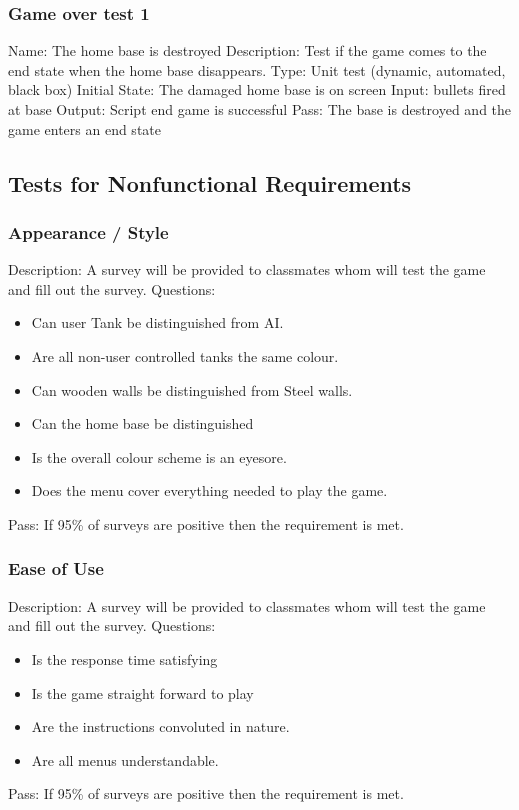 \documentclass{article}
\begin{document}
\subsubsection{Game over test 1}
Name:  The home base is destroyed\newline
Description: Test if the game comes to the end state when the home base 
disappears. \newline
Type: Unit test (dynamic, automated, black box) \newline
Initial State:  The damaged home base is on screen \newline
Input: bullets fired at base\newline
Output: Script end game is successful\newline
Pass:  The base is destroyed and the game enters an end state \newline





\subsection{Tests for Nonfunctional Requirements}

\subsubsection{Appearance / Style}
Description: A survey will be provided to classmates whom will test the game 
and fill out the survey.  \newline
Questions: 
\begin{itemize}
\item Can user Tank be distinguished from AI.
\item Are all non-user controlled tanks the same colour.
\item Can wooden walls be distinguished from Steel walls.
\item Can the home base be distinguished
\item Is the overall colour scheme is an eyesore.
\item Does the menu cover everything needed to play the game.
\end{itemize}
Pass: If 95\% of surveys are positive then the requirement is met.


\subsubsection{Ease of Use}
Description: A survey will be provided to classmates whom will test the game 
and fill out the survey.  \newline
Questions: 
\begin{itemize}
\item Is the response time satisfying
\item Is the game straight forward to play
\item Are the instructions convoluted in nature.
\item Are all menus understandable.
\end{itemize}
Pass: If 95\% of surveys are positive then the requirement is met.
\end{document}

